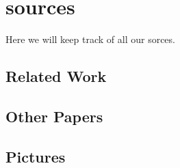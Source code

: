 \section{sources}

Here we will keep track of all our sorces.

\subsection{Related Work}

\subsection{Other Papers}

\subsection{Pictures}